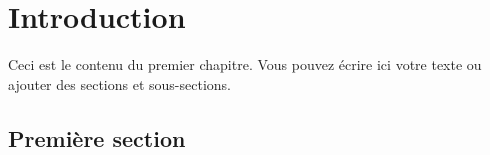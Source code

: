 \chapter{Introduction}
Ceci est le contenu du premier chapitre. Vous pouvez écrire ici votre texte ou ajouter des sections et sous-sections.

\section{Première section}
\lipsum[1-2] %

